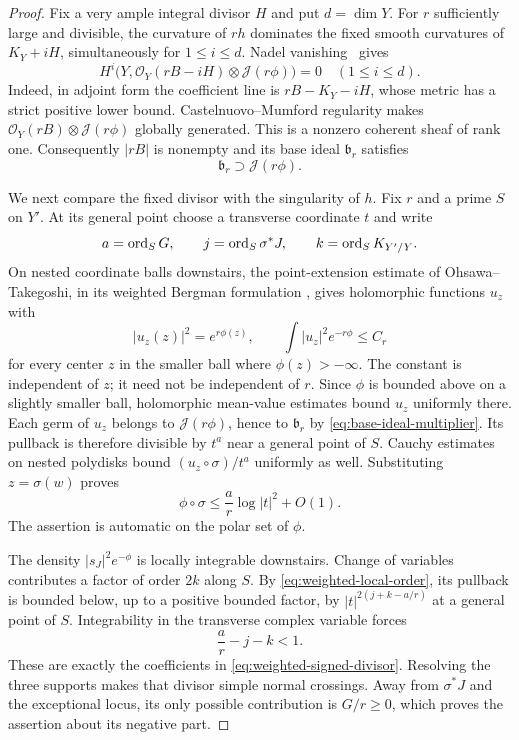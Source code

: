 \begin{proof}
Fix a very ample integral divisor $H$ and put $d=\dim Y$.  For $r$
sufficiently large and divisible, the curvature of $rh$ dominates the
fixed smooth curvatures of $K_Y+iH$, simultaneously for $1\le i\le d$.
Nadel vanishing~\cite{Nadel1990,Demailly2015} gives
\[
 H^i\bigl(Y,\mathcal O_Y(rB-iH)\otimes\mathcal J(r\phi)\bigr)=0
 \quad (1\le i\le d).
\]
Indeed, in adjoint form the coefficient line is $rB-K_Y-iH$, whose
metric has a strict positive lower bound.  Castelnuovo--Mumford
regularity makes
$\mathcal O_Y(rB)\otimes\mathcal J(r\phi)$ globally generated.
This is a nonzero coherent sheaf of rank one.  Consequently $|rB|$ is
nonempty and its base ideal $\mathfrak b_r$ satisfies
\begin{equation}\label{eq:base-ideal-multiplier}
 \mathfrak b_r\supset\mathcal J(r\phi).
\end{equation}

We next compare the fixed divisor with the singularity of $h$.  Fix $r$
and a prime $S$ on $Y'$.  At its general point choose a transverse
coordinate $t$ and write
\[
 a=\operatorname{ord}_SG,\qquad j=\operatorname{ord}_S\sigma^*J,
 \qquad k=\operatorname{ord}_SK_{Y'/Y}.
\]
On nested coordinate balls downstairs, the point-extension estimate
of Ohsawa--Takegoshi, in its weighted Bergman formulation
\cite{OhsawaTakegoshi1987,Demailly2015}, gives holomorphic functions
$u_z$ with
\[
 |u_z(z)|^2=e^{r\phi(z)},\qquad
 \int |u_z|^2e^{-r\phi}\le C_r
\]
for every center $z$ in the smaller ball where $\phi(z)>-\infty$.
The constant is independent of $z$; it need not be independent of $r$.
Since $\phi$ is bounded above on a slightly smaller ball, holomorphic
mean-value estimates bound $u_z$ uniformly there.  Each germ of $u_z$
belongs to $\mathcal J(r\phi)$, hence to $\mathfrak b_r$ by
\eqref{eq:base-ideal-multiplier}.  Its pullback is therefore divisible
by $t^a$ near a general point of $S$.  Cauchy estimates on nested
polydisks bound $(u_z\circ\sigma)/t^a$ uniformly as well.  Substituting
$z=\sigma(w)$ proves
\begin{equation}\label{eq:weighted-local-order}
 \phi\circ\sigma\le \frac ar\log|t|^2+O(1).
\end{equation}
The assertion is automatic on the polar set of $\phi$.

The density $|s_J|^2e^{-\phi}$ is locally integrable downstairs.
Change of variables contributes a factor of order $2k$ along $S$.
By \eqref{eq:weighted-local-order}, its pullback is bounded below,
up to a positive bounded factor, by
$|t|^{2(j+k-a/r)}$ at a general point of $S$.  Integrability in the
transverse complex variable forces
\[
 \frac ar-j-k<1.
\]
These are exactly the coefficients in
\eqref{eq:weighted-signed-divisor}.  Resolving the three supports makes
that divisor simple normal crossings.  Away from $\sigma^*J$ and the
exceptional locus, its only possible contribution is $G/r\ge0$,
which proves the assertion about its negative part.
\end{proof}

